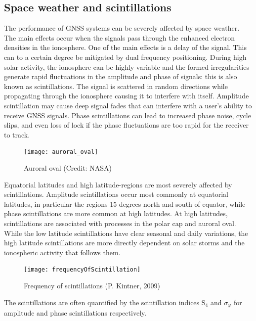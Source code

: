 \documentclass{themeensg}
\begin{document}
\subsection{Space weather and scintillations}

The performance of GNSS systems can be severely affected by space weather. The main effects occur when the signals pass through the enhanced electron densities in the ionosphere. One of the main effects is a delay of the signal. This can to a certain degree be mitigated by dual frequency positioning. During high solar activity, the ionosphere can be highly variable and the formed irregularities generate rapid fluctuations in the amplitude and phase of signals: this is also known as scintillations. The signal is scattered in random directions while propagating through the ionosphere causing it to interfere with itself. Amplitude scintillation may cause deep signal fades that can interfere with a user’s ability to receive GNSS signals. Phase scintillations can lead to increased phase noise, cycle slips, and even loss of lock if the phase fluctuations are too rapid for the receiver to track.\

\begin{figure}[hb]
	\centering
	\texttt{[image: auroral\_oval]}
	\caption{Auroral oval (Credit: NASA)}
\end{figure}

Equatorial latitudes and high latitude-regions are most severely affected by scintillations. Amplitude scintillations occur most commonly at equatorial latitudes, in particular the regions 15 degrees north and south of equator, while phase scintillations are more common at high latitudes. At high latitudes, scintillations are associated with processes in the polar cap and auroral oval. While the low latitude scintillations have clear seasonal and daily variations, the high latitude scintillations are more directly dependent on solar storms and the ionospheric activity that follows them.\\

\begin{figure}[ht]
	\centering
	\texttt{[image: frequencyOfScintillation]}
	\caption{Frequency of scintillations (P. Kintner, 2009)}
	\label{map}
\end{figure}

The scintillations are often quantified by the scintillation indices $\text{S}_{\text{4}}$ and $\sigma_\varphi$ for amplitude and phase scintillations respectively.
\end{document}
